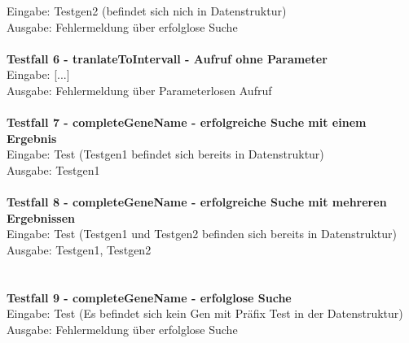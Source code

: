 \documentclass{scrartcl}
\begin{document}
Eingabe: Testgen2 (befindet sich nich in Datenstruktur)\\
Ausgabe: Fehlermeldung über erfolglose Suche\\
\\
\textbf{Testfall 6 - tranlateToIntervall - Aufruf ohne Parameter}\\
Eingabe: [...]\\
Ausgabe: Fehlermeldung über Parameterlosen Aufruf\\
\\
\textbf{Testfall 7 - completeGeneName - erfolgreiche Suche mit einem Ergebnis}\\
Eingabe: Test (Testgen1 befindet sich bereits in Datenstruktur)\\
Ausgabe: Testgen1\\
\\
\textbf{Testfall 8 - completeGeneName - erfolgreiche Suche mit mehreren Ergebnissen}\\
Eingabe: Test (Testgen1 und Testgen2 befinden sich bereits in Datenstruktur)\\
Ausgabe: Testgen1, Testgen2\\
\\
\newpage\hfill\\
\textbf{Testfall 9 - completeGeneName - erfolglose Suche}\\
Eingabe: Test (Es befindet sich kein Gen mit Präfix Test in der Datenstruktur)\\
Ausgabe: Fehlermeldung über erfolglose Suche
\end{document}
